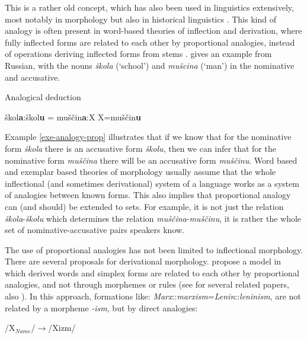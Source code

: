 This is a rather old concept, which has also been used in linguistics extensively, most notably in morphology but also in historical linguistics \autocite{Paul.1995}. This kind of analogy is often present in word-based theories of inflection and derivation, where fully inflected forms are related to each other by proportional analogies, instead of operations deriving inflected forms from stems \autocites{Blevins.2006a, Blevins.2008, Blevins.2016a}. \textcite[p. 543]{Blevins.2006a} gives an example from Russian, with the nouns \textit{škola} (`school') and \textit{mušcina} (`man') in the nominative and accusative.

\begin{exe}
    \ex \label{exe-analogy-prop} Analogical deduction
    \begin{xlist}
        \ex škol\textbf{a}:škol\textbf{u} = muščin\textbf{a}:X
        \ex X=muščin\textbf{u}
    \end{xlist}
\end{exe}

Example \ref{exe-analogy-prop} illustrates that if we know that for the nominative form \textit{škola} there is an accusative form \textit{školu}, then we can infer that for the nominative form \textit{muščina} there will be an accusative form \textit{muščinu}. Word based and exemplar based theories of morphology usually assume that the whole inflectional (and sometimes derivational) system of a language works as a system of analogies between known forms. This also implies that proportional analogy can (and should) be extended to sets. For example, it is not just the relation \textit{škola}-\textit{školu} which determines the relation \textit{muščina}-\textit{muščinu}, it is rather the whole set of nominative-accusative pairs speakers know.

The use of proportional analogies has not been limited to inflectional morphology. There are several proposals for derivational morphology. \textcite{Singh.2003a} propose a model in which derived words and simplex forms are related to each other by proportional analogies, and not through morphemes or rules (see \textcite{Singh.2003} for several related papers, also \textcite{Neuvel.2001}). In this approach, formations like: \textit{Marx}::\textit{marxism}=\-\textit{Lenin}::\textit{leninism}, are not related by a morpheme \textit{-ism}, but by direct analogies:

\begin{exe}
    \ex \label{analogy-derivation-ism} /X$_{Name}$/$\rightarrow$/Xizm/
\end{exe}

